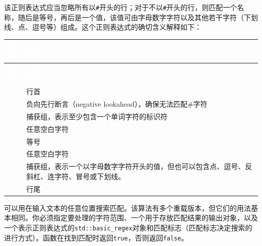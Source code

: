 
该正则表达式应当忽略所有以\texttt{\#}开头的行；对于不以\texttt{\#}开头的行，则匹配一个名称，随后是等号，再后是一个值，该值可由字母数字字符以及其他若干字符（下划线、点、逗号等）组成。这个正则表达式的确切含义解释如下：



\myTableBegin
\begin{xltabular}{\textwidth}{|>{\hsize\raggedright\arraybackslash}X|>{\hsize\raggedright\arraybackslash}X|}
\hline
{} \textcolor{white}{\textbf{部分}} & \textcolor{white}{\textbf{说明}} \\
\hline
\endfirsthead
{} \textcolor{white}{\textbf{部分}} & \textcolor{white}{\textbf{说明}} \\
\hline
\endhead
\myttbr{\textasciicircum{}} & 行首\\
\hline
{} & 负向先行断言（negative lookahead），确保无法匹配\#字符\\
\hline
{} & 捕获组，表示至少包含一个单词字符的标识符\\
\hline
{} & 任意空白字符\\
\hline
\myttbr{=} & 等号\\
\hline
{} & 任意空白字符\\
\hline
{} & 捕获组，表示一个以字母数字字符开头的值，但也可以包含点、逗号、反斜杠、连字符、冒号或下划线。\\
\hline
\myttbr{\$} & 行尾\\
\hline
\end{xltabular}
\myTableEnd






可以用在输入文本的任意位置搜索匹配。该算法有多个重载版本，但它们的用法基本相同。你必须指定要处理的字符范围、一个用于存放匹配结果的输出对象，以及一个表示正则表达式的\texttt{std::\allowbreak{}basic\_\allowbreak{}regex}对象和匹配标志（匹配标志决定搜索的进行方式）。函数在找到匹配时返回\texttt{true}，否则返回\texttt{false}。


